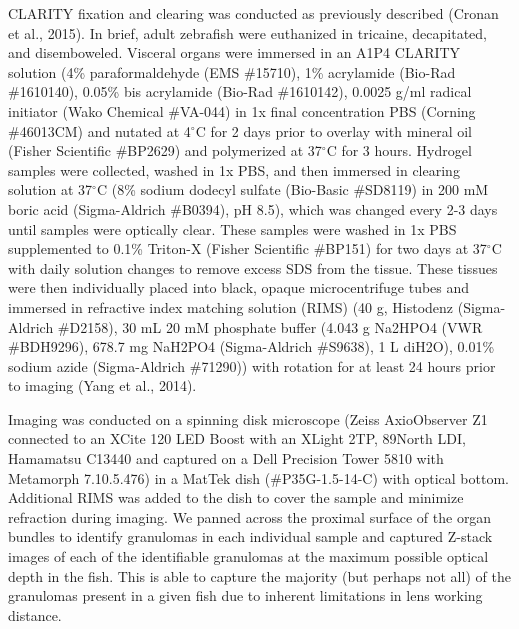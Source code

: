 CLARITY fixation and clearing was conducted as previously described (Cronan et al., 2015). In brief, adult zebrafish were euthanized in tricaine, decapitated, and disemboweled. Visceral organs were immersed in an A1P4 CLARITY solution (4\% paraformaldehyde (EMS \#15710), 1\% acrylamide (Bio-Rad \#1610140), 0.05\% bis acrylamide (Bio-Rad \#1610142), 0.0025 g/ml radical initiator (Wako Chemical \#VA-044) in 1x final concentration PBS (Corning \#46013CM) and nutated at 4$^{\circ}$C for 2 days prior to overlay with mineral oil (Fisher Scientific \#BP2629) and polymerized at 37$^{\circ}$C for 3 hours. Hydrogel samples were collected, washed in 1x PBS, and then immersed in clearing solution at 37$^{\circ}$C (8\% sodium dodecyl sulfate (Bio-Basic \#SD8119) in 200 mM boric acid (Sigma-Aldrich \#B0394), pH 8.5), which was changed every 2-3 days until samples were optically clear. These samples were washed in 1x PBS supplemented to 0.1\% Triton-X (Fisher Scientific \#BP151) for two days at 37$^{\circ}$C with daily solution changes to remove excess SDS from the tissue. These tissues were then individually placed into black, opaque microcentrifuge tubes and immersed in refractive index matching solution (RIMS) (40 g, Histodenz (Sigma-Aldrich \#D2158), 30 mL 20 mM phosphate buffer (4.043 g Na2HPO4 (VWR \#BDH9296), 678.7 mg NaH2PO4 (Sigma-Aldrich \#S9638), 1 L diH2O), 0.01\% sodium azide (Sigma-Aldrich \#71290)) with rotation for at least 24 hours prior to imaging (Yang et al., 2014). 

Imaging was conducted on a spinning disk microscope (Zeiss AxioObserver Z1 connected to an XCite 120 LED Boost with an XLight 2TP, 89North LDI, Hamamatsu C13440 and captured on a Dell Precision Tower 5810 with Metamorph 7.10.5.476) in a MatTek dish (\#P35G-1.5-14-C) with optical bottom. Additional RIMS was added to the dish to cover the sample and minimize refraction during imaging. We panned across the proximal surface of the organ bundles to identify granulomas in each individual sample and captured Z-stack images of each of the identifiable granulomas at the maximum possible optical depth in the fish. This is able to capture the majority (but perhaps not all) of the granulomas present in a given fish due to inherent limitations in lens working distance.

